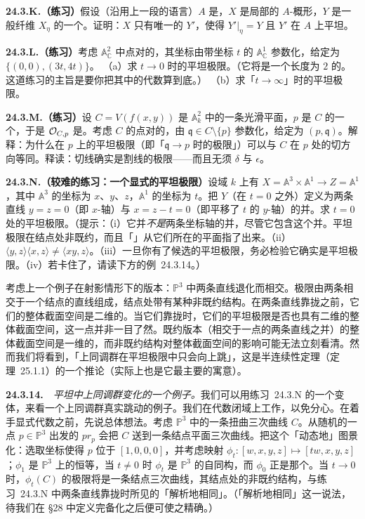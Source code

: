 \textbf{24.3.K.（练习）}\quad 假设（沿用上一段的语言）$A$ 是\trDVR，$X$ 是局部\trNoether{}的 $A$-概形，$Y$ 是一般纤维 $X_\eta$ 的一个\trClosedSubscheme。证明：$X$ 只有唯一的\trClosedSubscheme{} $Y'$，使得 $Y'|_\eta=Y$ 且 $Y'$ 在 $A$ 上平坦。

\textbf{24.3.L.（练习）}\quad 考虑 $\mathbb{A}^2_{\mathbb{C}}$ 中点对的\trFamily，其坐标由带坐标 $t$ 的 $\mathbb{A}^1_{\mathbb{C}}$ 参数化，给定为 $\{(0,0),(3t,4t)\}$。
（a）求 $t\to 0$ 时的平坦极限。（它将是一个长度为 $2$ 的\trSubscheme。这道练习的主旨是要你把其中的代数算到底。）
（b）求「$t\to\infty$」时的平坦极限。

\textbf{24.3.M.（练习）}\quad 设 $C=V(f(x,y))$ 是 $\mathbb{A}^2_k$ 中的一条光滑平面\trCurve，$p$ 是 $C$ 的一个\trClosedPoint，于是 $\mathcal{O}_{C,p}$ 是\trDVR。考虑 $C$ 的点对的\trFamily，由 $\mathfrak{q}\in C\setminus\{p\}$ 参数化，给定为 $(p,\mathfrak{q})$。解释：为什么在 $p$ 上的平坦极限（即「$\mathfrak{q}\to p$ 时的极限」）可以与 $C$ 在 $p$ 处的切方向等同。释读：切线确实是割线的极限——而且无须 $\delta$ 与 $\epsilon$。

\textbf{24.3.N.（较难的练习：一个显式的平坦极限）}\quad 设域 $k$ 上有 $X=\mathbb{A}^3\times\mathbb{A}^1\to Z=\mathbb{A}^1$，其中 $\mathbb{A}^3$ 的坐标为 $x$、$y$、$z$，$\mathbb{A}^1$ 的坐标为 $t$。把 $Y$（在 $t=0$ 之外）定义为两条直线 $y=z=0$（即 $x$-轴）与 $x=z-t=0$（即平移了 $t$ 的 $y$-轴）的并。求 $t=0$ 处的平坦极限。（提示：（i）它并\emph{不是}两条坐标轴的并，尽管它包含这个并。平坦极限在结点处非既约，而且「\trFuzz」从它们所在的平面指了出来。（ii）$\langle y,z\rangle\langle x,z\rangle\ne\langle xy,z\rangle$。（iii）一旦你有了候选的平坦极限，务必检验它确实是平坦极限。（iv）若卡住了，请读下方的\mbox{例~24.3.14}。）

考虑上一个例子在射影情形下的版本：$\mathbb{P}^3$ 中两条直线退化而相交。极限由两条相交于一个结点的直线组成，结点处带有某种非既约结构。在两条直线靠拢之前，它们的整体截面空间是二维的。当它们靠拢时，它们的平坦极限是否也具有二维的整体截面空间，这一点并非一目了然。既约版本（相交于一点的两条直线之并）的整体截面空间是一维的，而非既约结构对整体截面空间的影响可能无法立刻看清。然而我们将看到，「上同调群在平坦极限中只会向上跳」，这是半连续性定理（\mbox{定理~25.1.1}）的一个推论（实际上也是它最主要的寓意）。

\textbf{24.3.14.}\ \extrahard\ \emph{平坦\trFamily{}中上同调群变化的一个例子。}\quad 我们可以用\mbox{练习~24.3.N} 的一个变体，来看一个上同调群真实跳动的例子。我们在代数闭域上工作，以免分心。在着手显式代数之前，先说总体想法。考虑 $\mathbb{P}^3$ 中的一条扭曲三次曲线 $C$。从随机的一点 $p\in\mathbb{P}^3$ 出发的\trProjection{} $pr_p$ 会把 $C$ 送到一条结点平面三次曲线。把这个\trProjection{}「动态地」图景化：选取坐标使得 $p$ 位于 $[1,0,0,0]$，并考虑映射 $\phi_t\colon[w,x,y,z]\mapsto[tw,x,y,z]$；$\phi_1$ 是 $\mathbb{P}^3$ 上的恒等，当 $t\ne 0$ 时 $\phi_t$ 是 $\mathbb{P}^3$ 的自同构，而 $\phi_0$ 正是那个\trProjection。当 $t\to 0$ 时，$\phi_t(C)$ 的极限将是一条结点三次曲线，其结点处的非既约结构，与\mbox{练习~24.3.N} 中两条直线靠拢时所见的「解析地相同」。（「解析地相同」这一说法，待我们在 \S28 中定义完备化之后便可使之精确。）

